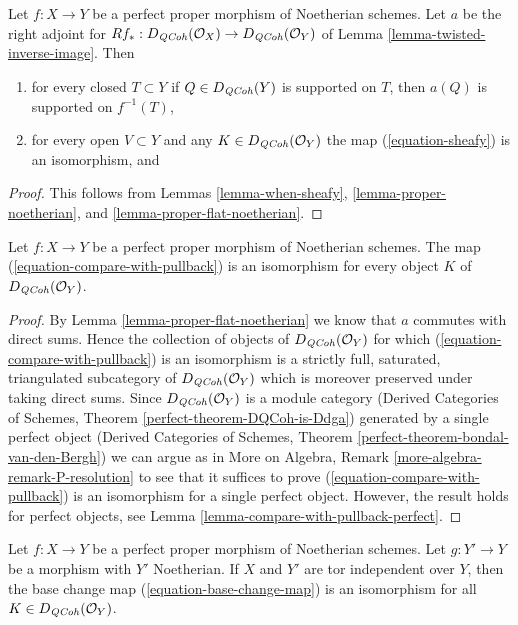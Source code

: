 \begin{lemma}
\label{lemma-proper-flat-noetherian-relative}
Let $f : X \to Y$ be a perfect proper morphism of Noetherian schemes.
Let $a$ be the right adjoint for
$Rf_* : D_{\mathit{QCoh}}(\mathcal{O}_X) \to D_{\mathit{QCoh}}(\mathcal{O}_Y)$ of
Lemma \ref{lemma-twisted-inverse-image}. Then
\begin{enumerate}
\item for every closed $T \subset Y$ if $Q \in D_{\mathit{QCoh}}(Y)$ is supported on $T$,
then $a(Q)$ is supported on $f^{-1}(T)$,
\item for every open $V \subset Y$ and any $K \in D_{\mathit{QCoh}}(\mathcal{O}_Y)$
the map (\ref{equation-sheafy}) is an isomorphism, and
\end{enumerate}
\end{lemma}

\begin{proof}
This follows from Lemmas \ref{lemma-when-sheafy},
\ref{lemma-proper-noetherian}, and
\ref{lemma-proper-flat-noetherian}.
\end{proof}

\begin{lemma}
\label{lemma-compare-with-pullback-flat-proper-noetherian}
Let $f : X \to Y$ be a perfect proper morphism of Noetherian
schemes. The map (\ref{equation-compare-with-pullback}) is an isomorphism
for every object $K$ of $D_{\mathit{QCoh}}(\mathcal{O}_Y)$.
\end{lemma}

\begin{proof}
By Lemma \ref{lemma-proper-flat-noetherian} we know that $a$ commutes
with direct sums. Hence the collection of objects of
$D_{\mathit{QCoh}}(\mathcal{O}_Y)$ for which (\ref{equation-compare-with-pullback})
is an isomorphism is a strictly full, saturated, triangulated
subcategory of $D_{\mathit{QCoh}}(\mathcal{O}_Y)$ which is moreover
preserved under taking direct sums. Since $D_{\mathit{QCoh}}(\mathcal{O}_Y)$
is a module category (Derived Categories of Schemes, Theorem
\ref{perfect-theorem-DQCoh-is-Ddga}) generated by a single
perfect object (Derived Categories of Schemes, Theorem
\ref{perfect-theorem-bondal-van-den-Bergh})
we can argue as in
More on Algebra, Remark \ref{more-algebra-remark-P-resolution}
to see that it suffices to prove (\ref{equation-compare-with-pullback})
is an isomorphism for a single perfect object.
However, the result holds for perfect objects, see
Lemma \ref{lemma-compare-with-pullback-perfect}.
\end{proof}

\begin{lemma}
\label{lemma-proper-perfect-base-change}
Let $f : X \to Y$ be a perfect proper morphism of Noetherian schemes.
Let $g : Y' \to Y$ be a morphism with $Y'$ Noetherian. If $X$ and
$Y'$ are tor independent over $Y$, then the base
change map (\ref{equation-base-change-map}) is an isomorphism
for all $K \in D_{\mathit{QCoh}}(\mathcal{O}_Y)$.
\end{lemma}


